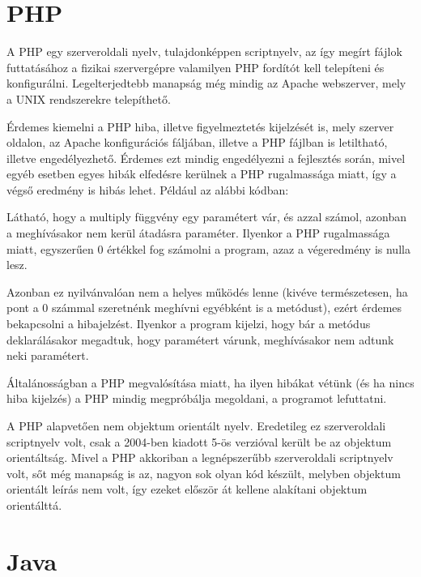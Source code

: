 \section{PHP}

A PHP egy szerveroldali nyelv, tulajdonképpen scriptnyelv, az így megírt fájlok futtatásához a fizikai szervergépre valamilyen PHP fordítót kell telepíteni és konfigurálni. Legelterjedtebb manapság még mindig az Apache webszerver, mely a UNIX rendszerekre telepíthető.

Érdemes kiemelni a PHP hiba, illetve figyelmeztetés kijelzését is, mely szerver oldalon, az Apache konfigurációs fáljában, illetve a PHP fájlban is letiltható, illetve engedélyezhető. Érdemes ezt mindig engedélyezni a fejlesztés során, mivel egyéb esetben egyes hibák elfedésre kerülnek a PHP rugalmassága miatt, így a végső eredmény is hibás lehet. Például az alábbi kódban:


Látható, hogy a multiply függvény egy paramétert vár, és azzal számol, azonban a meghívásakor nem kerül átadásra paraméter. Ilyenkor a PHP rugalmassága miatt, egyszerűen 0 értékkel fog számolni a program, azaz a végeredmény is nulla lesz.

Azonban ez nyilvánvalóan nem a helyes működés lenne (kivéve természetesen, ha pont a 0 számmal szeretnénk meghívni egyébként is a metódust), ezért érdemes bekapcsolni a hibajelzést. Ilyenkor a program kijelzi, hogy bár a metódus deklarálásakor megadtuk, hogy paramétert várunk, meghívásakor nem adtunk neki paramétert.

Általánosságban a PHP megvalósítása miatt, ha ilyen hibákat vétünk (és ha nincs hiba kijelzés) a PHP mindig megpróbálja megoldani, a programot lefuttatni.

A PHP alapvetően nem objektum orientált nyelv. Eredetileg ez szerveroldali scriptnyelv volt, csak a 2004-ben kiadott 5-ös verzióval került be az objektum orientáltság. Mivel a PHP akkoriban a legnépszerűbb szerveroldali scriptnyelv volt, sőt még manapság is az, nagyon sok olyan kód készült, melyben objektum orientált leírás nem volt, így ezeket először át kellene alakítani objektum orientálttá.

\section{Java}

